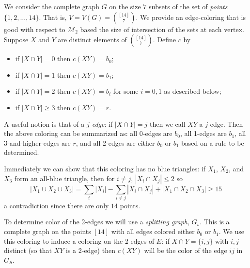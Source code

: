 \documentclass{article}
\theoremstyle{definition}
\def\M{\mathcal{M}}
\begin{document}
We consider the complete graph $G$ on the size $7$ subsets of the set of
\emph{points} $\{1,2,\dots,14\}$. That is, $V = V(G) = \binom{[14]}{7}$. We
provide an edge-coloring that is good with respect to $\M_{2}$ based the size
of intersection of the sets at each vertex. Suppose $X$ and $Y$ are distinct
elements of $\binom{[14]}{7}$.  Define $c$ by
\begin{itemize}
\item if $|X \cap Y| = 0$ then $c(XY) = b_{0}$;
\item if $|X \cap Y| = 1$ then $c(XY) = b_{1}$;
\item if $|X \cap Y| = 2$ then $c(XY) = b_{i}$ for some $i = 0,1$ as described
  below;
\item if $|X \cap Y| \geq 3$ then $c(XY) = r$.
\end{itemize}
A useful notion is that of a \emph{$j$-edge}: if $|X \cap Y| = j$ then we call
$XY$ a $j$-edge. Then the above coloring can be summarized as: all 0-edges are
$b_{0}$, all 1-edges are $b_{1}$, all 3-and-higher-edges are $r$, and all
2-edges are either $b_{0}$ or $b_{1}$ based on a rule to be determined.

Immediately we can show that this coloring has no blue triangles: if $X_{1}$,
$X_{2}$, and $X_{3}$ form an all-blue triangle, then for $i \neq j$, $|X_{i}
\cap X_{j}| \leq 2$ so
\begin{equation*}
  |X_{1} \cup X_{2} \cup X_{3}|
  = \sum_{i} |X_{i}|  - \sum_{i\neq j} |X_{i} \cap X_{j}| + |X_{1} \cap X_{2} \cap X_{3}|  \geq 15
\end{equation*}
a contradiction since there are only $14$ points.

To determine color of the 2-edges we will use a \emph{splitting graph},
$G_{s}$. This is a complete graph on the points $[14]$ with all edges colored
either $b_{0}$ or $b_{1}$. We use this coloring to induce a coloring on the
2-edges of $E$: if $X \cap Y = \{i, j\}$ with $i,j$ distinct (so that $XY$ is a
2-edge) then $c(XY)$ will be the color of the edge $ij$ in $G_{S}$.

\end{document}

